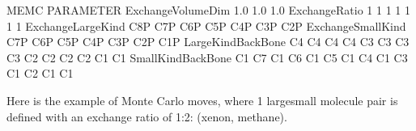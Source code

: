 \documentclass[letterpaper,10pt,english]{sphinxmanual}
\begin{document}
\begin{sphinxVerbatim}[commandchars=\\\{\}]
\PYGZsh{}\PYGZsh{}\PYGZsh{}\PYGZsh{}\PYGZsh{}\PYGZsh{}\PYGZsh{}\PYGZsh{}\PYGZsh{}\PYGZsh{}\PYGZsh{}\PYGZsh{}\PYGZsh{}\PYGZsh{}\PYGZsh{}\PYGZsh{}\PYGZsh{}\PYGZsh{}\PYGZsh{}\PYGZsh{}\PYGZsh{}\PYGZsh{}\PYGZsh{}\PYGZsh{}\PYGZsh{}\PYGZsh{}\PYGZsh{}\PYGZsh{}\PYGZsh{}\PYGZsh{}\PYGZsh{}\PYGZsh{}\PYGZsh{}\PYGZsh{}\PYGZsh{}\PYGZsh{}\PYGZsh{}\PYGZsh{}\PYGZsh{}\PYGZsh{}\PYGZsh{}\PYGZsh{}\PYGZsh{}\PYGZsh{}\PYGZsh{}\PYGZsh{}\PYGZsh{}\PYGZsh{}\PYGZsh{}\PYGZsh{}\PYGZsh{}\PYGZsh{}\PYGZsh{}\PYGZsh{}\PYGZsh{}\PYGZsh{}\PYGZsh{}\PYGZsh{}\PYGZsh{}\PYGZsh{}\PYGZsh{}\PYGZsh{}\PYGZsh{}\PYGZsh{}\PYGZsh{}\PYGZsh{}\PYGZsh{}\PYGZsh{}\PYGZsh{}\PYGZsh{}
\PYGZsh{} MEMC PARAMETER
\PYGZsh{}\PYGZsh{}\PYGZsh{}\PYGZsh{}\PYGZsh{}\PYGZsh{}\PYGZsh{}\PYGZsh{}\PYGZsh{}\PYGZsh{}\PYGZsh{}\PYGZsh{}\PYGZsh{}\PYGZsh{}\PYGZsh{}\PYGZsh{}\PYGZsh{}\PYGZsh{}\PYGZsh{}\PYGZsh{}\PYGZsh{}\PYGZsh{}\PYGZsh{}\PYGZsh{}\PYGZsh{}\PYGZsh{}\PYGZsh{}\PYGZsh{}\PYGZsh{}\PYGZsh{}\PYGZsh{}\PYGZsh{}\PYGZsh{}\PYGZsh{}\PYGZsh{}\PYGZsh{}\PYGZsh{}\PYGZsh{}\PYGZsh{}\PYGZsh{}\PYGZsh{}\PYGZsh{}\PYGZsh{}\PYGZsh{}\PYGZsh{}\PYGZsh{}\PYGZsh{}\PYGZsh{}\PYGZsh{}\PYGZsh{}\PYGZsh{}\PYGZsh{}\PYGZsh{}\PYGZsh{}\PYGZsh{}\PYGZsh{}\PYGZsh{}\PYGZsh{}\PYGZsh{}\PYGZsh{}\PYGZsh{}\PYGZsh{}\PYGZsh{}\PYGZsh{}\PYGZsh{}\PYGZsh{}\PYGZsh{}\PYGZsh{}\PYGZsh{}\PYGZsh{}
ExchangeVolumeDim   1.0   1.0   1.0
ExchangeRatio       1       1       1      1      1      1      1
ExchangeLargeKind   C8P    C7P    C6P    C5P    C4P    C3P    C2P
ExchangeSmallKind   C7P    C6P    C5P    C4P    C3P    C2P    C1P
LargeKindBackBone   C4 C4  C4 C4  C3 C3  C3 C3  C2 C2  C2 C2  C1 C1
SmallKindBackBone   C1 C7  C1 C6  C1 C5  C1 C4  C1 C3  C1 C2  C1 C1
\end{sphinxVerbatim}

\sphinxAtStartPar
Here is the example of  Monte Carlo moves, where 1 large\sphinxhyphen{}small molecule pair is defined with an exchange ratio of 1:2: (xenon, methane).
\end{document}
